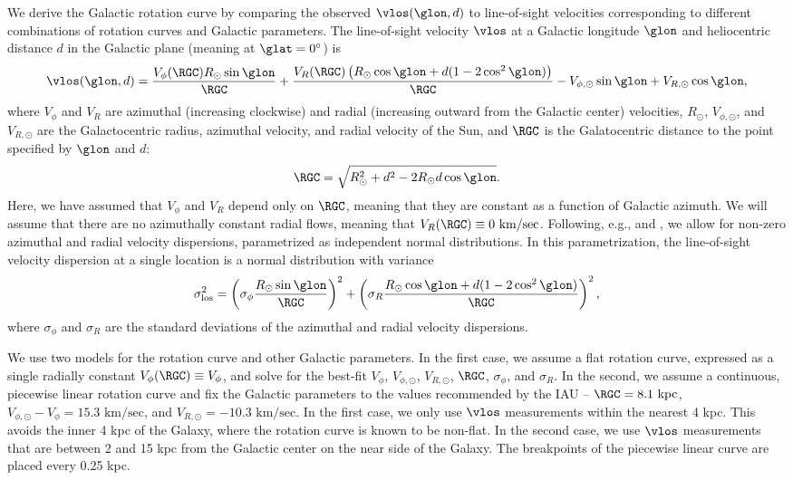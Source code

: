 We derive the Galactic rotation curve by comparing the observed $\vlos(\glon, d)$ to line-of-sight velocities corresponding to different combinations of rotation curves and Galactic parameters. 
The line-of-sight velocity $\vlos$ at a Galactic longitude $\glon$ and heliocentric distance $d$ in the Galactic plane (meaning at $\glat=0^\circ$) is 
\begin{equation}
\label{eqn:vlos_mean}
\vlos(\glon, d) = \frac{V_\phi (\RGC) R_\odot \sin\glon}{\RGC} + 
\frac{V_R (\RGC) \left(R_\odot \cos \glon + d (1 - 2 \cos^2 \glon)  \right) }{\RGC} - V_{\phi, \odot} \sin \glon + V_{R, \odot} \cos \glon,
\end{equation}
where $V_\phi$ and $V_R$ are azimuthal (increasing clockwise) and radial (increasing outward from the Galactic center) velocities, $R_\odot$, $V_{\phi, \odot}$, and $V_{R, \odot}$ are the Galactocentric radius, azimuthal velocity, and radial velocity of the Sun, and $\RGC$ is the Galatocentric distance to the point specified by $\glon$ and $d$:
\begin{equation}
\RGC = \sqrt{R^2_\odot + d^2 - 2 R_\odot d \cos \glon}.
\end{equation}
Here, we have assumed that $V_\phi$ and $V_R$ depend only on $\RGC$, meaning that they are constant as a function of Galactic azimuth.
We will assume that there are no azimuthally constant radial flows, meaning that $V_R(\RGC) \equiv 0\text{ km/sec}$.
Following, e.g., \citet{Reid:2009jb} and \citet{Bovy_2009}, we allow for non-zero azimuthal and radial velocity dispersions, parametrized as independent normal distributions. 
In this parametrization, the line-of-sight velocity dispersion at a single location is a normal distribution with variance
\begin{equation}
\label{eqn:vlos_var}
\sigma^2_\mathrm{los} = \left(\sigma_\phi \frac{R_\odot \sin \glon}{\RGC} \right)^2 + 
\left(\sigma_R  \frac{R_\odot \cos \glon + d (1 - 2 \cos^2 \glon)}{\RGC} \right)^2,
\end{equation}
where $\sigma_\phi$ and $\sigma_R$ are the standard deviations of the azimuthal and radial velocity dispersions. 

We use two models for the rotation curve and other Galactic parameters. 
In the first case, we assume a flat rotation curve, expressed as a single radially constant $V_\phi(\RGC) \equiv V_\phi$, and solve for the best-fit $V_\phi$, $V_{\phi, \odot}$, $V_{R, \odot}$, $\RGC$, $\sigma_\phi$, and $\sigma_R$. 
In the second, we assume a continuous, piecewise linear rotation curve and fix the Galactic parameters to the values recommended by the IAU -- $\RGC = 8.1\text{ kpc}$, $V_{\phi, \odot} - V_{\phi} = 15.3 \text{ km/sec}$, and $V_{R, \odot} = - 10.3 \text{ km/sec}$. 
In the first case, we only use $\vlos$ measurements within the nearest 4 kpc.
This avoids the inner 4 kpc of the Galaxy, where the rotation curve is known to be non-flat.
In the second case, we use $\vlos$ measurements that are between 2 and 15 kpc from the Galactic center on the near side of the Galaxy. 
The breakpoints of the piecewise linear curve are placed every 0.25 kpc.

